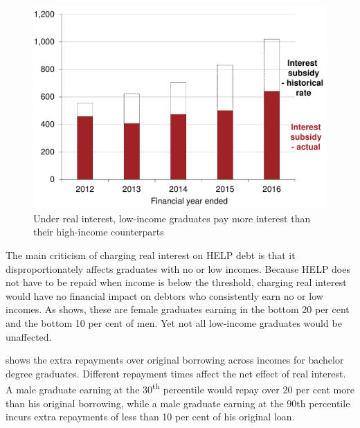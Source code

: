 \documentclass[embargoed]{grattan}
\begin{document}
\begin{figure}
\caption{Under real interest, low-income graduates pay more interest than their high-income counterparts}\label{fig:fig13-under-real-interest-low-income-grads-pay-more-interest-than-high-income-counterparts}


\includegraphics[page=13]{atlas/Chartpack.pdf}
\end{figure}

The main criticism of charging real interest on \gls{HELP} debt is that it disproportionately affects graduates with no or low incomes.
Because \gls{HELP} does not have to be repaid when income is below the threshold, charging real interest would have no financial impact on debtors who consistently earn no or low incomes.
As  shows, these are female graduates earning in the bottom 20 per cent and the bottom 10 per cent of men.
Yet not all low-income graduates would be unaffected.

 shows the extra repayments over original borrowing across incomes for bachelor degree graduates.
Different repayment times affect the net effect of real interest.
A male graduate earning at the 30\textsuperscript{th} percentile would repay over 20 per cent more than his original borrowing, while a male graduate earning at the 90th percentile incurs extra repayments of less than 10 per cent of his original loan.
\end{document}
